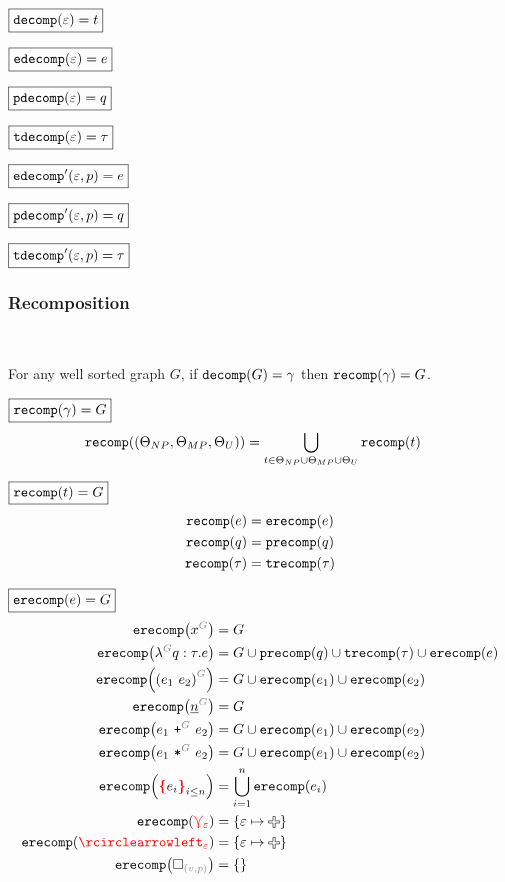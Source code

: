 \noindent $\boxed{\decomp{\e} = t}$
%
\figureDecompositionDefDecompTerm

\noindent $\boxed{\edecomp{\e} = e}$
%
\figureDecompositionDefEdecomp

\noindent $\boxed{\pdecomp{\e} = q}$
%
\figureDecompositionDefPdecomp

\noindent $\boxed{\tdecomp{\e} = \tau}$
%
\figureDecompositionDefTdecomp

\noindent $\boxed{\edecompPrime{\e}{p} = e}$
%
\figureDecompositionDefEdecompPrime

\noindent $\boxed{\pdecompPrime{\e}{p} = q}$
%
\figureDecompositionDefPdecompPrime

\noindent $\boxed{\tdecompPrime{\e}{p} = \tau}$
%
\figureDecompositionDefTdecompPrime%


\subsubsection{Recomposition}\hspace*{\fill} \\

\begin{theorem}
  For any well sorted graph $G$,
  if $\decomp{G} = \Grove$ then $\recomp{\Grove} = G$.
\end{theorem}

\noindent $\boxed{\recomp{\Grove} = G}$
%
\begin{align*}
  \recomp{(\Set[NP], \Set[MP], \Set[U])} &= \bigcup_{t \in \Set[NP] \cup \Set[MP] \cup \Set[U]} \recomp{t}
\end{align*}

\noindent $\boxed{\recomp{t} = G}$
%
\begin{align*}
  \recomp{e} &= \erecomp{e} \\
  \recomp{q} &= \precomp{q} \\
  \recomp{\tau} &= \trecomp{\tau}
\end{align*}

\noindent $\boxed{\erecomp{e} = G}$
%
\begin{align*}
  \erecomp{\eVar{G}{x}} &= G
  \\
  \erecomp{\eFun{G}{q}{\tau}{e}}
    &= G \cup \precomp{q} \cup \trecomp{\tau} \cup \erecomp{e}
  \\
  \erecomp{\eApp{G}{e_1}{e_2}}
    &= G \cup \erecomp{e_1} \cup \erecomp{e_2}
  \\
  \erecomp{\eNum{G}{n}} &= G
  \\
  \erecomp{\ePlus{G}{e_1}{e_2}}
    &= G \cup \erecomp{e_1} \cup \erecomp{e_2}
  \\
  \erecomp{\eTimes{G}{e_1}{e_2}}
    &= G \cup \erecomp{e_1} \cup \erecomp{e_2}
  \\
  \erecomp{\conflictHole{e_i}_{i \leq n}}
  &= \bigcup_{i=1}^n \erecomp{e_i}
  \\
  \erecomp{\multiVertex{\e}} &= \SetOf{\e \mapsto \Plus}
  \\
  \erecomp{\cycleVertex{\e}} &= \SetOf{\e \mapsto \Plus}
  \\
  \erecomp{\emptyHole{v}{p}} &= \SetOf{}
\end{align*}

